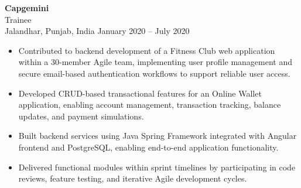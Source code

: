 \documentclass[11pt]{article}
\begin{document}
\textbf{Capgemini} \\
Trainee \\
Jalandhar, Punjab, India \hfill January 2020 -- July 2020
\begin{itemize}[leftmargin=15pt,itemsep=-6pt]

\item Contributed to backend development of a Fitness Club web application within a 30-member Agile team, implementing user profile management and secure email-based authentication workflows to support reliable user access.
\item Developed CRUD-based transactional features for an Online Wallet application, enabling account management, transaction tracking, balance updates, and payment simulations.
\item Built backend services using Java Spring Framework integrated with Angular frontend and PostgreSQL, enabling end-to-end application functionality.
\item Delivered functional modules within sprint timelines by participating in code reviews, feature testing, and iterative Agile development cycles.
\end{itemize}




% 
\end{document}
